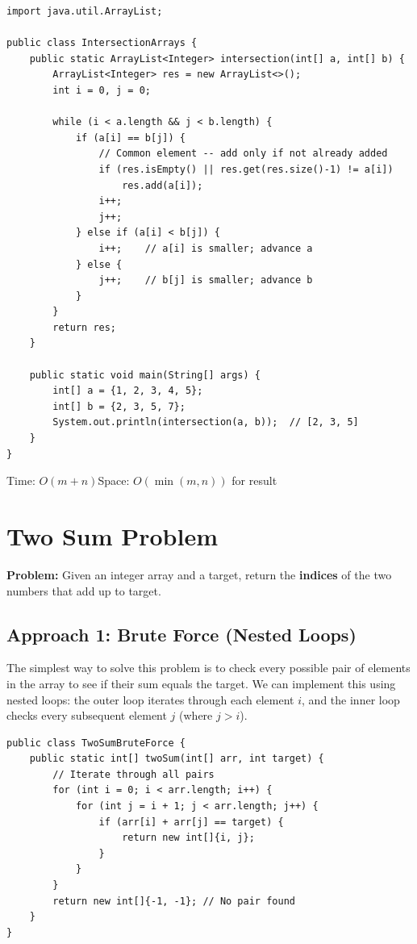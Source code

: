 \documentclass[12pt,a4paper,oneside]{book}
\begin{document}
\begin{lstlisting}[caption={Intersection of Two Sorted Arrays --- Two Pointer}]
import java.util.ArrayList;

public class IntersectionArrays {
    public static ArrayList<Integer> intersection(int[] a, int[] b) {
        ArrayList<Integer> res = new ArrayList<>();
        int i = 0, j = 0;

        while (i < a.length && j < b.length) {
            if (a[i] == b[j]) {
                // Common element -- add only if not already added
                if (res.isEmpty() || res.get(res.size()-1) != a[i])
                    res.add(a[i]);
                i++;
                j++;
            } else if (a[i] < b[j]) {
                i++;    // a[i] is smaller; advance a
            } else {
                j++;    // b[j] is smaller; advance b
            }
        }
        return res;
    }

    public static void main(String[] args) {
        int[] a = {1, 2, 3, 4, 5};
        int[] b = {2, 3, 5, 7};
        System.out.println(intersection(a, b));  // [2, 3, 5]
    }
}
\end{lstlisting}

\begin{complexity}
Time: $O(m + n)$\quad Space: $O(\min(m,n))$ for result
\end{complexity}

\section{Two Sum Problem}

\textbf{Problem:} Given an integer array and a target, return the \textbf{indices} of the two numbers that add up to target.

\subsection{Approach 1: Brute Force (Nested Loops)}
The simplest way to solve this problem is to check every possible pair of elements in the array to see if their sum equals the target. We can implement this using nested loops: the outer loop iterates through each element $i$, and the inner loop checks every subsequent element $j$ (where $j > i$).

\begin{lstlisting}[caption={Two Sum --- Brute Force approach O(n$^2$) time O(1) space}]
public class TwoSumBruteForce {
    public static int[] twoSum(int[] arr, int target) {
        // Iterate through all pairs
        for (int i = 0; i < arr.length; i++) {
            for (int j = i + 1; j < arr.length; j++) {
                if (arr[i] + arr[j] == target) {
                    return new int[]{i, j};
                }
            }
        }
        return new int[]{-1, -1}; // No pair found
    }
}
\end{lstlisting}
\end{document}
